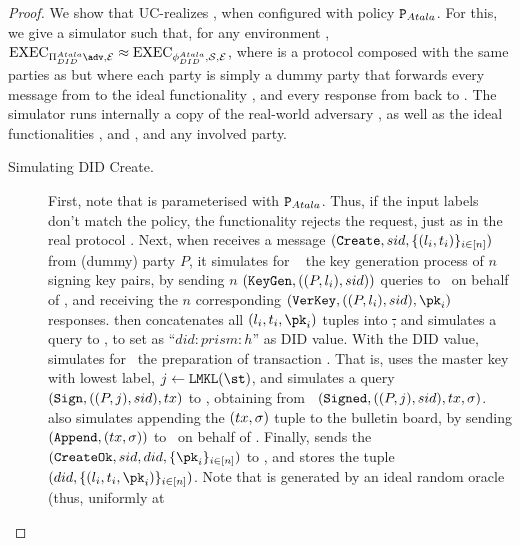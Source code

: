 \begin{proof}
  We show that \RealPKIDIDAtala UC-realizes \IdealFPKIDID, when configured
  with policy $\P_{Atala}$. For this, we give a simulator \Sim such that, for
  any environment \Env, $\Exec_{\RealPKIDIDAtala\adv,\Env} \approx
  \Exec_{\phiDIDAtala,\Sim,\Env}$,
  where \phiDIDAtala is a protocol composed with the same parties as
  \RealPKIDIDAtala but where each party is simply a dummy party that forwards
  every message from \Env to the ideal functionality \IdealFPKIDID, and every
  response from \IdealFPKIDID back to \Env. The simulator \Sim runs internally a
  copy of the real-world adversary \adv, as well as the ideal functionalities
  \IdealFRO, \IdealFSig and \IdealFaobb, and any involved party.

  \begin{description}
  \item[Simulating DID Create.] %
    First, note that \IdealFPKIDID is parameterised with $\P_{Atala}$. Thus,
    if the input labels don't match the policy, the functionality rejects the
    request, just as in the real protocol \RealPKIDIDAtala.
    Next, when \Sim receives a message $(\uccmd{Create},\sid,\lbrace (\lbl_i,
    \typ_i) \rbrace_{i\in[n]})$ from (dummy) party $P$, it simulates for \adv~
    the key generation process of $n$ signing key pairs, by sending $n$
    $(\uccmd{KeyGen},((P,\lbl_i),\sid))$ queries to \adv~on
    behalf of \IdealFSig, and receiving the $n$ corresponding $(\uccmd{VerKey}, 
    ((P,\lbl_i), \sid), \pk_i)$ responses.
    \Sim then concatenates all $(\lbl_i,\typ_i,\pk_i)$ tuples into \st, and
    simulates a query to \IdealFRO {}, to set \did as ``$did:prism: h$'' as DID value.
    With the DID value, \Sim simulates for \adv~the preparation of transaction
    \tx. That is, \Sim uses the master key with lowest label, $j \gets
    \LMKL(\st)$, and simulates a query $(\uccmd{Sign},((P,j),\sid),\tx)$ to
    \IdealFSig, obtaining from \adv~$(\uccmd{Signed},((P,j),\sid),\tx,\sig)$.
    \Sim also simulates appending the $(\tx,\sig)$ tuple to the bulletin board,
    by sending $(\uccmd{Append},(\tx,\sig))$ to \adv~on behalf of \IdealFaobb.
    Finally, \Sim sends the $(\uccmd{CreateOk},\sid,\did,\lbrace \pk_i
    \rbrace_{i\in[n]})$ to \IdealFPKIDID, and stores the tuple $(\did,\lbrace
    (\lbl_i,\typ_i,\pk_i)\rbrace_{i\in[n]})$.
    Note that \did is generated by an ideal random oracle (thus, uniformly at

\end{description}
\end{proof}
